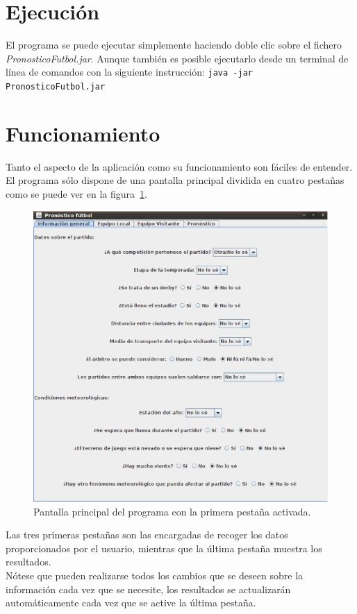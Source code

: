 \documentclass[a4paper,12pt]{article}
\begin{document}
\section{Ejecución}
El programa se puede ejecutar simplemente haciendo doble clic sobre el fichero \textit{PronosticoFutbol.jar}.
Aunque también es posible ejecutarlo desde un terminal de línea de comandos con la siguiente instrucción:
\texttt{java -jar PronosticoFutbol.jar}

\section{Funcionamiento}
Tanto el aspecto de la aplicación como su funcionamiento son fáciles de entender. 
El programa sólo dispone de una pantalla principal dividida en cuatro pestañas como se puede ver en la figura~\ref{fig:pestaña1}.
\begin{figure}[h]
 \begin{center}
  \includegraphics[scale=0.4]{p1.eps}
\caption{Pantalla principal del programa con la primera pestaña activada.}
\label{fig:pestaña1}
 \end{center}
\end{figure} 

Las tres primeras pestañas son las encargadas de recoger los datos proporcionados por el usuario, mientras que la última pestaña muestra los resultados.
\\
Nótese que pueden realizarse todos los cambios que se deseen sobre la información cada vez que se necesite,
los resultados se actualizarán automáticamente cada vez que se active la última pestaña.
\end{document}
